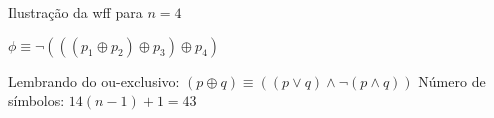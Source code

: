 \expandafter\documentclass\expandafter[table, usenames, svgnames, dvipsnames,14pt, \classopts]{beamer}
\begin{document}
\begin{frame}{Ilustração da wff para $n = 4$}

    $\phi \equiv \lnot(((p_1 \oplus p_2) \oplus p_3) \oplus p_4)$
    
    \vspace{1em}
    
    \begin{outline}
        \1 Lembrando do ou-exclusivo:
            \2[-] $(p \oplus q) \equiv ((p \lor q) \land \lnot{(p \land q)})$
        \1 Número de símbolos: $14(n-1) + 1 = 43$
    \end{outline}

\end{frame}

\end{document}
